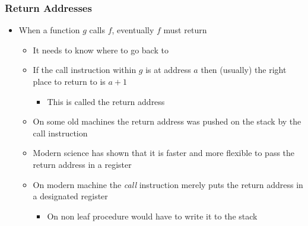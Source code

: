 \documentclass[11pt]{article}
\begin{document}
\subsubsection{Return Addresses}
\label{sec:org70b4e2f}
\begin{itemize}
\item When a function \(g\) calls \(f\), eventually \(f\) must return
\begin{itemize}
\item It needs to know where to go back to
\item If the call instruction within \(g\) is at address \(a\) then (usually) the right place to return to is \(a+1\)
\begin{itemize}
\item This is called the return address
\end{itemize}
\item On some old machines the return address was pushed on the stack by the call instruction
\item Modern science has shown that it is faster and more flexible to pass the return address in a register
\item On modern machine the \emph{call} instruction merely puts the return address in a designated register
\begin{itemize}
\item On non leaf procedure would have to write it to the stack
\end{itemize}
\end{itemize}
\end{itemize}
\end{document}

